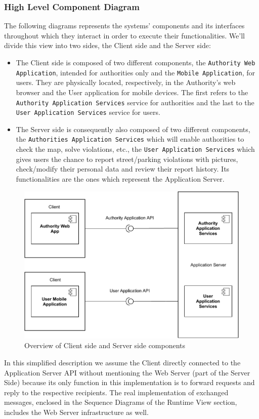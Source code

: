 \documentclass[12pt,a4paper]{article}
\begin{document}
\subsubsection{High Level Component Diagram}
The following diagrams represents the systems' components and its interfaces throughout which they interact in order to execute their functionalities. We'll divide this view into two sides, the Client side and the Server side:
\begin{itemize}
\item The Client side is composed of two different components, 
the \texttt{Authority Web Application}, intended for authorities only and 
the \texttt{Mobile Application}, for users. They are physically located, respectively, in the Authority's web browser and the User application for mobile devices.
The first refers to the \texttt{Authority Application Services} service for authorities and 
the last to the \texttt{User Application Services} service for users.
\item The Server side is consequently also composed of two different components, the \texttt{Authorities Application Services} which will enable authorities to check the map, solve violations, etc., the \texttt{User Application Services} which gives users the chance to report street/parking violations with pictures, check/modify their personal data and review their report history. Its functionalities are the ones which represent the Application Server.
\end{itemize}
\begin{figure}[H]
		\centering
		\includegraphics[width=1.0\linewidth]{../assets/images/component_no3rdparty.pdf}
		\caption{Overview of Client side and Server side components}
	\end{figure}
In this simplified description we assume the Client directly connected to the Application Server API without mentioning the Web Server (part of the Server Side) because its only function in this implementation is to forward requests and reply to the respective recipients.
The real implementation of exchanged messages, enclosed in the Sequence Diagrams of the Runtime View section, includes the Web Server infrastructure as well.
\newpage
\end{document}
